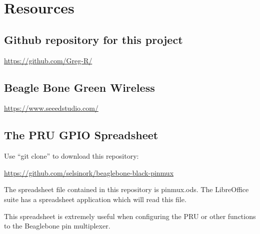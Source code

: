 %
%
%

\chapter{Resources}

\section{Github repository for this project}

\url{https://github.com/Greg-R/}



\section{Beagle Bone Green Wireless}

\url{https://www.seeedstudio.com/}


\section{The PRU GPIO Spreadsheet}

Use ``git clone'' to download this repository:

\url{https://github.com/selsinork/beaglebone-black-pinmux}

The spreadsheet file contained in this repository is pinmux.ods.
The LibreOffice suite has a spreadsheet application which will read
this file.

This spreadsheet is extremely useful when configuring the PRU or
other functions to the Beaglebone pin multiplexer.


